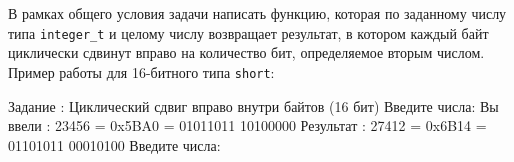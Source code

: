 
\begin{zztask}
В рамках общего условия задачи написать функцию, которая по заданному числу
типа \texttt{integer\_t} и целому числу возвращает результат, в котором каждый байт
циклически сдвинут вправо на количество бит, определяемое вторым числом.
Пример работы для 16-битного типа \texttt{short}:
\begin{zzoutput}
  Задание \thezztask: Циклический сдвиг вправо внутри байтов (16 бит)
  Введите числа: 
  Вы ввели  : 23456 = 0x5BA0 = 01011011 10100000
  Результат : 27412 = 0x6B14 = 01101011 00010100
  Введите числа: \zzuser{ }
\end{zzoutput}
\end{zztask}


